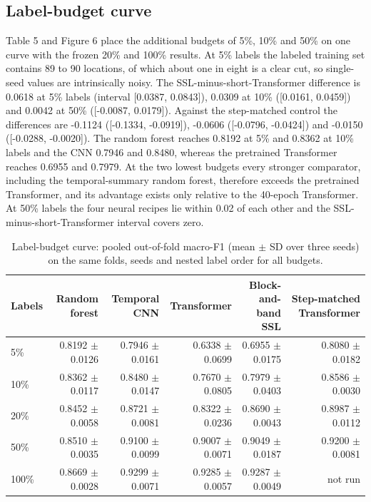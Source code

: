 \documentclass[10pt,a4paper,twocolumn]{article}
\begin{document}
\subsection{Label-budget curve}
Table 5 and Figure 6 place the additional budgets of 5\%, 10\% and 50\% on one curve with the frozen 20\% and 100\% results. At 5\% labels the labeled training set contains 89 to 90 locations, of which about one in eight is a clear cut, so single-seed values are intrinsically noisy. The SSL-minus-short-Transformer difference is 0.0618 at 5\% labels (interval [0.0387, 0.0843]), 0.0309 at 10\% ([0.0161, 0.0459]) and 0.0042 at 50\% ([-0.0087, 0.0179]). Against the step-matched control the differences are -0.1124 ([-0.1334, -0.0919]), -0.0606 ([-0.0796, -0.0424]) and -0.0150 ([-0.0288, -0.0020]). The random forest reaches 0.8192 at 5\% and 0.8362 at 10\% labels and the CNN 0.7946 and 0.8480, whereas the pretrained Transformer reaches 0.6955 and 0.7979. At the two lowest budgets every stronger comparator, including the temporal-summary random forest, therefore exceeds the pretrained Transformer, and its advantage exists only relative to the 40-epoch Transformer. At 50\% labels the four neural recipes lie within 0.02 of each other and the SSL-minus-short-Transformer interval covers zero.

\begin{table}[tbp]
\centering
\footnotesize
\caption{Label-budget curve: pooled out-of-fold macro-F1 (mean $\pm$ SD over three seeds) on the same folds, seeds and nested label order for all budgets.}
\begin{tabular}{lrrrrr}
\toprule
Labels & Random forest & Temporal CNN & Transformer & Block-and-band SSL & Step-matched Transformer \\ \midrule
5\% & 0.8192 $\pm$ 0.0126 & 0.7946 $\pm$ 0.0161 & 0.6338 $\pm$ 0.0699 & 0.6955 $\pm$ 0.0175 & 0.8080 $\pm$ 0.0182 \\
10\% & 0.8362 $\pm$ 0.0117 & 0.8480 $\pm$ 0.0147 & 0.7670 $\pm$ 0.0805 & 0.7979 $\pm$ 0.0403 & 0.8586 $\pm$ 0.0030 \\
20\% & 0.8452 $\pm$ 0.0058 & 0.8721 $\pm$ 0.0081 & 0.8322 $\pm$ 0.0236 & 0.8690 $\pm$ 0.0043 & 0.8987 $\pm$ 0.0112 \\
50\% & 0.8510 $\pm$ 0.0035 & 0.9100 $\pm$ 0.0099 & 0.9007 $\pm$ 0.0071 & 0.9049 $\pm$ 0.0187 & 0.9200 $\pm$ 0.0081 \\
100\% & 0.8669 $\pm$ 0.0028 & 0.9299 $\pm$ 0.0071 & 0.9285 $\pm$ 0.0057 & 0.9287 $\pm$ 0.0049 & not run \\
\bottomrule
\end{tabular}
\end{table}
\end{document}
